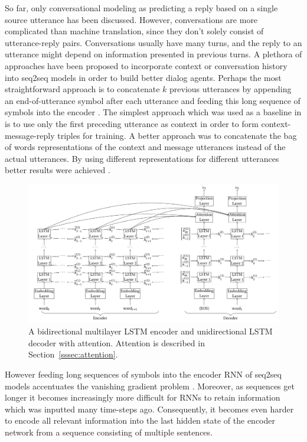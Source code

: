 \documentclass[12pt]{article}
\begin{document}
So far, only conversational modeling as predicting a reply based on a single source utterance has been discussed. However, conversations are more complicated than machine translation, since they don't solely consist of utterance-reply pairs. Conversations usually have many turns, and the reply to an utterance might depend on information presented in previous turns. A plethora of approaches have been proposed to incorporate context or conversation history into seq2seq models in order to build better dialog agents. Perhaps the most straightforward approach is to concatenate \(k\) previous utterances by appending an end-of-utterance symbol after each utterance and feeding this long sequence of symbols into the encoder \cite{Vinyals:2015}. The simplest approach which was used as a baseline in \cite{Sordoni:2015} is to use only the first preceding utterance as context in order to form context-message-reply triples for training. A better approach was to concatenate the bag of words representations of the context and message utterances instead of the actual utterances. By using different representations for different utterances better results were achieved \cite{Sordoni:2015}.

\begin{figure}[H]
	\centering
	\includegraphics[width=1.0\textwidth]{pics/bilstm.png}
	\caption{A bidirectional multilayer LSTM encoder and unidirectional LSTM decoder \cite{Yin:2017} with attention. Attention is described in Section~\ref{sssec:attention}.}
	\label{fig:context}
\end{figure}
However feeding long sequences of symbols into the encoder RNN of seq2seq models accentuates the vanishing gradient problem \cite{Hochreiter:1998}. Moreover, as sequences get longer it becomes increasingly more difficult for RNNs to retain information which was inputted many time-steps ago. Consequently, it becomes even harder to encode all relevant information into the last hidden state of the encoder network from a sequence consisting of multiple sentences.
\end{document}
